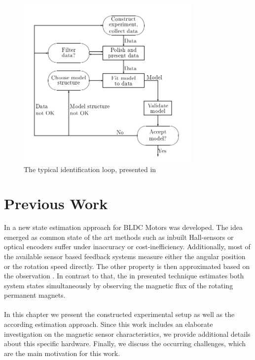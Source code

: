 \documentclass[english]{isasthesis}
\begin{document}
	\begin{figure}[t]
    		\centering
    			\includegraphics[width=0.8\textwidth]{figures/identification_loop.jpg}   
    		\caption{The typical identification loop, presented in \cite{sid}}
    		\label{fig:sid loop}
    		\end{figure}
	\chapter{Previous Work}\label{previous works}
	In \cite{fabian} a new state estimation approach for BLDC Motors was developed. The idea emerged as common state of the art methods such as inbuilt Hall-sensors or optical encoders suffer under inaccuracy or cost-inefficiency. Additionally, most of the available sensor based feedback systems measure either the angular position or the rotation speed directly. The other property is then approximated based on the observation \cite{basarurposition}. In contrast to that, the in \cite{fabian} presented technique estimates both system states simultaneously by observing the magnetic flux of the rotating permanent magnets. \\\\
	   In this chapter we present the constructed experimental setup as well as the according estimation approach. Since this work includes an elaborate investigation on the magnetic sensor characteristics, we provide additional details about this specific hardware. Finally, we discuss the occurring challenges, which are the main motivation for this work.  
\end{document}

